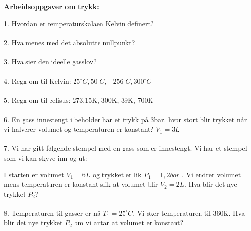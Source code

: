 \documentclass[12pt,a4paper]{article}
\begin{document}
\begin{center}
    \large\textbf{Arbeidsoppgaver om trykk:}
\end{center}
1.  Hvordan er temperaturskalaen Kelvin definert?\\\\
2.  Hva menes med det absolutte nullpunkt?\\\\
3. Hva sier den ideelle gasslov?\\\\
4.  Regn om til Kelvin:  $25 ^\circ C, 50^\circ C, -256^\circ C, 300^\circ C $\\\\
5. Regn om til celisus: 273,15K, 300K, 39K, 700K\\\\
6. En gass innestengt i beholder har et trykk på 3bar.  hvor stort blir trykket når vi halverer volumet og temperaturen er konstant? $V_1=3L$\\\\
7.  Vi har gitt følgende stempel med en gass som er innestengt.  Vi har et stempel som vi kan skyve inn og ut:\vspace{0.5cm}\\
\begin{center}
\end{center}\vspace{1cm}
I starten er volumet $V_1=6L$ og trykket er lik $P_1=1,2bar$ .  Vi endrer volumet mens temperaturen er konstant slik at volumet blir $V_2=2L$.  Hva blir det nye trykket $P_2?$ \\\\
8.  Temperaturen til gasser er nå $T_1=25^\circ C$.  Vi øker temperaturen til 360K.  Hva blir det nye trykket $P_2$ om vi antar at volumet er konstant?\\
\end{document}
